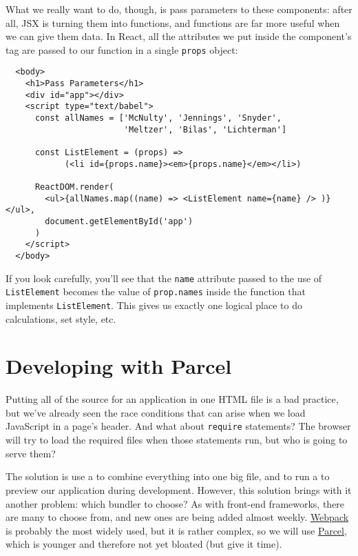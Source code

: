 What we really want to do,
though,
is pass parameters to these components:
after all,
JSX is turning them into functions,
and functions are far more useful when we can give them data.
In React,
all the attributes we put inside the component's tag
are passed to our function in a single \texttt{props} object:

\begin{verbatim}
  <body>
    <h1>Pass Parameters</h1>
    <div id="app"></div>
    <script type="text/babel">
      const allNames = ['McNulty', 'Jennings', 'Snyder',
                        'Meltzer', 'Bilas', 'Lichterman']

      const ListElement = (props) =>
            (<li id={props.name}><em>{props.name}</em></li>)

      ReactDOM.render(
        <ul>{allNames.map((name) => <ListElement name={name} /> )}</ul>,
        document.getElementById('app')
      )
    </script>
  </body>
\end{verbatim}

If you look carefully,
you'll see that the \texttt{name} attribute passed to the use of \texttt{ListElement}
becomes the value of \texttt{prop.names} inside the function that implements \texttt{ListElement}.
This gives us exactly one logical place to do calculations, set style, etc.

\section{Developing with Parcel}\label{s:dynamic-parcel}

Putting all of the source for an application in one HTML file is a bad practice,
but we've already seen the race conditions that can arise when we load JavaScript in a page's header.
And what about \texttt{require} statements?
The browser will try to load the required files when those statements run,
but who is going to serve them?

The solution is use a  to combine everything into one big file,
and to run a  to preview our application during development.
However,
this solution brings with it another problem:
which bundler to choose?
As with front-end frameworks,
there are many to choose from,
and new ones are being added almost weekly.
\href{https://webpack.js.org/}{Webpack} is probably the most widely used,
but it is rather complex,
so we will use \href{https://parceljs.org/}{Parcel},
which is younger and therefore not yet bloated
(but give it time).

